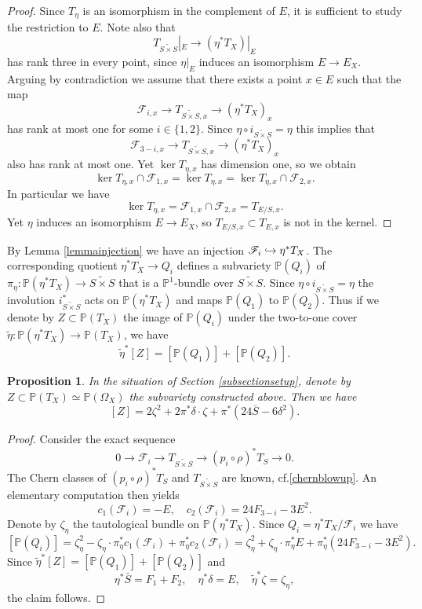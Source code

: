 \documentclass[11pt]{article}
\newcommand{\cf}{cf.\xspace}
\let\mathcal\mathscr
\newcommand\hto{\mathrel{\lhook\joinrel\to}}
\theoremstyle{plain}
\newtheorem{proposition}[theorem]{Proposition}
\theoremstyle{definition}
\newcommand{\PP}{\ensuremath{\mathbb{P}}}
\newcommand{\holom}[3]{\ensuremath{#1:#2\to #3}}
\newcommand\sF{{\mathcal F}}
\newcommand{\blS}{\ensuremath{\widetilde{S \times S}}}
\begin{document}
\begin{proof}
Since $T_\eta$ is an isomorphism in the complement of $E$, it is sufficient to study the restriction to $E$.
Note also that
\[
T_{\blS}|_E \to (\eta^* T_X)|_E
\]
has rank three in every point, since $\eta|_E$ induces an isomorphism $E \to E_X$.
Arguing by contradiction we assume that there exists a point $x \in E$ such that the map
\[
\sF_{i,x} \to T_{\blS,x} \to (\eta^* T_X)_x
\]
has rank at most one for some $i \in \{1, 2 \}$. Since $\eta \circ i_{\blS} = \eta$ this implies that
\[
\sF_{3-i,x} \to T_{\blS,x} \to (\eta^* T_X)_x
\]
also has rank at most one. Yet $\ker T_{\eta,x}$ has dimension one, so we obtain
\[
\ker T_{\eta,x} \cap \sF_{1,x} = \ker T_{\eta,x} = \ker T_{\eta,x} \cap \sF_{2,x}.
\]
In particular we have
\[
\ker T_{\eta,x} = \sF_{1,x} \cap \sF_{2,x}= T_{E/S,x}.
\]
Yet $\eta$ induces an isomorphism $E \to E_X$, so $T_{E/S,x} \subset T_{E,x}$ is not in the kernel.
\end{proof}

By Lemma \ref{lemmainjection} we have an injection $\sF_i \hto \eta^* T_X$. The corresponding quotient
$\eta^* T_X \to Q_i$ defines a subvariety $\PP(Q_i)$ of $\holom{\pi_\eta}{\PP(\eta^* T_X)}{\blS}$
that is a $\PP^1$-bundle over $\blS$.
Since $\eta \circ i_{\blS} = \eta$ the involution $i_{\blS}^*$ acts on $\PP(\eta^* T_X)$ and maps
$\PP(Q_1)$ to $\PP(Q_2)$. Thus if we denote by $Z \subset \PP(T_X)$ the image of $\PP(Q_i)$ under
the two-to-one cover $\tilde \eta: \PP(\eta^* T_X) \to \PP(T_X)$, we have
\[
\tilde \eta^* [Z] = [\PP(Q_1)] + [\PP(Q_2)].
\]
\begin{proposition}
In the situation of Section \ref{subsectionsetup}, denote by $Z \subset \PP(T_X) \simeq \PP(\Omega_X)$ the subvariety constructed above. Then we have
\begin{equation} \label{classZ}
[Z] = 2 \zeta^2 + 2 \pi^* \delta \cdot \zeta + \pi^* (24 \bar S-6 \delta^2).
\end{equation}
\end{proposition}

\begin{proof}
Consider the exact sequence
\[
0 \to \sF_i \to T_{\blS} \to (p_i \circ \rho)^* T_S \to 0.
\]
The Chern classes of $(p_i \circ \rho)^* T_S$ and $T_{\blS}$ are known, \cf \eqref{chernblowup}.
An elementary computation then yields
\begin{equation} \label{chernFi}
c_1(\sF_i)=-E, \quad c_2(\sF_i) = 24 F_{3-i} - 3 E^2.
\end{equation}
Denote by $\zeta_\eta$ the tautological bundle on $\PP(\eta^* T_X)$.
Since $Q_i = \eta^* T_X/\sF_i$ we have
\[
[\PP(Q_i)] = \zeta_\eta^2 - \zeta_\eta \cdot \pi_\eta^* c_1(\sF_i) + \pi_\eta^* c_2(\sF_i)
=
\zeta_\eta^2 + \zeta_\eta \cdot \pi_\eta^* E + \pi_\eta^* (24 F_{3-i} - 3 E^2).
\]
Since $\tilde \eta^* [Z] = [\PP(Q_1)] + [\PP(Q_2)]$ and
\[
\eta^* \bar S = F_1+F_2, \quad \eta^* \delta = E, \quad \tilde \eta^* \zeta = \zeta_\eta,
\]
the claim follows.
\end{proof}
\end{document}

